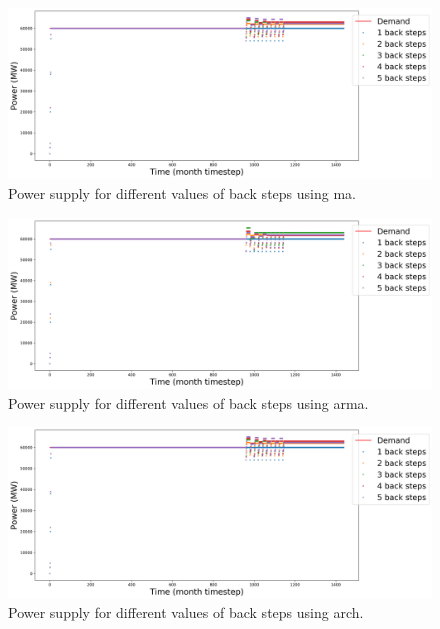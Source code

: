 \documentclass[11pt]{article}
\begin{document}
\begin{figure}[!h]
	\centering
	\includegraphics[width=\textwidth]{23-figures/23-power-buffer0-ma-back.png} 
	\hfill
	\caption{Power supply for different values of back steps using ma.}
	\label{fig:23-back-ma}
\end{figure}

\begin{figure}[!h]
	\centering
	\includegraphics[width=\textwidth]{23-figures/23-power-buffer0-arma-back.png} 
	\hfill
	\caption{Power supply for different values of back steps using arma.}
	\label{fig:23-back-arma}
\end{figure}

\begin{figure}[!h]
	\centering
	\includegraphics[width=\textwidth]{23-figures/23-power-buffer0-arch-back.png} 
	\hfill
	\caption{Power supply for different values of back steps using arch.}
	\label{fig:23-back-arch}
\end{figure}
\end{document}
